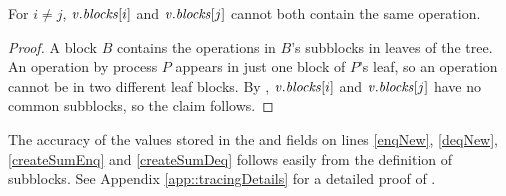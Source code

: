 \begin{corollary}\label{lem::noDuplicates}
For  $i\neq j$, $\mbox{\textnormal{\textit{v}}}.\mbox{\textit{blocks}}[i]$ and $\mbox{\textnormal{\textit{v}}}.\mbox{\textit{blocks}}[j]$ cannot both contain the same operation.
\end{corollary}
\begin{proof}
A block $B$ contains the operations in $B$'s subblocks in leaves of the tree.
An operation by process $P$ appears in just one block of $P$'s leaf, so
an operation 
cannot be in two different leaf blocks. 
By , $\mbox{\textnormal{\textit{v}}}.\mbox{\textit{blocks}}[i]$ and $\mbox{\textnormal{\textit{v}}}.\mbox{\textit{blocks}}[j]$ have no common subblocks, so the claim follows.
\end{proof}



%


The accuracy of the values stored in the  and  fields
on lines \ref{enqNew}, \ref{deqNew}, \ref{createSumEnq} and \ref{createSumDeq} follows easily
from the definition of subblocks.  See Appendix 
\ref{app::tracingDetails} for a detailed proof of .

